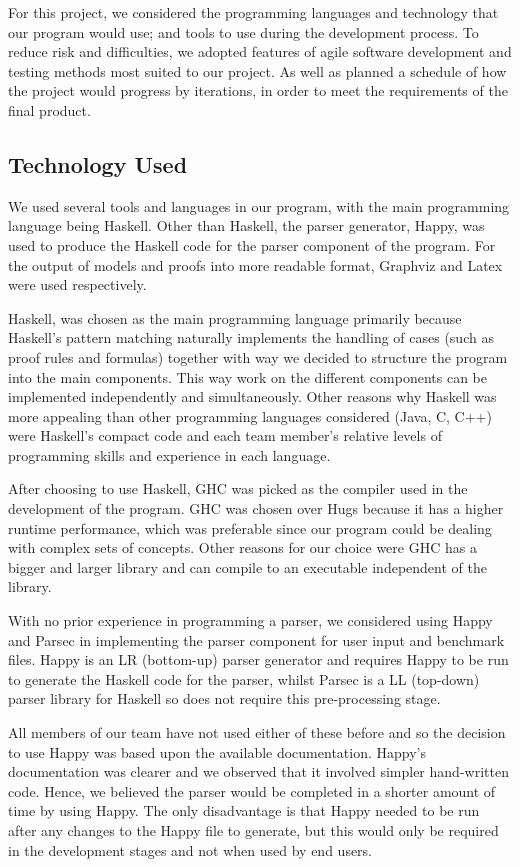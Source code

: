 For this project, we considered the programming languages and technology that our program would use; and tools to use during the development process. To reduce risk and difficulties, we adopted features of agile software development and testing methods most suited to our project. As well as planned a schedule of how the project would progress by iterations, in order to meet the requirements of the final product.

\subsection{Technology Used}
\label{sec:techused}

We used several tools and languages in our program, with the main programming language being Haskell. Other than Haskell, the parser generator, Happy, was used to produce the Haskell code for the parser component of the program. For the output of models and proofs into more readable format, Graphviz and Latex were used respectively.

Haskell, was chosen as the main programming language primarily because Haskell's pattern matching naturally implements the handling of cases (such as proof rules and formulas) together with way we decided to structure the program into the main components. This way work on the different components can be implemented independently and simultaneously. Other reasons why Haskell was more appealing than other programming languages considered (Java, C, C++) were Haskell's compact code and each team member's relative levels of programming skills and experience in each language.

After choosing to use Haskell, GHC was picked as the compiler used in the development of the program. GHC was chosen over Hugs because it has a higher runtime performance, which was preferable since our program could be dealing with complex sets of concepts. Other reasons for our choice were GHC has a bigger and larger library and can compile to an executable independent of the library.

With no prior experience in programming a parser, we considered using Happy and Parsec in implementing the parser component for user input and benchmark files. Happy is an LR (bottom-up) parser generator and requires Happy to be run to generate the Haskell code for the parser, whilst Parsec is a LL (top-down) parser library for Haskell so does not require this pre-processing stage.

All members of our team have not used either of these before and so the decision to use Happy was based upon the available documentation. Happy's documentation was clearer and we observed that it involved simpler hand-written code. Hence, we believed the parser would be completed in a shorter amount of time by using Happy. The only disadvantage is that Happy needed to be run after any changes to the Happy file to generate, but this would only be required in the development stages and not when used by end users.

